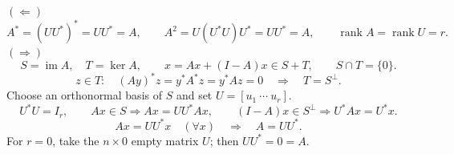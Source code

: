 \documentclass[UTF8,10pt,letterpaper,fontset=fandol]{ctexart}
\DeclareMathOperator{\rank}{rank}
\DeclareMathOperator{\im}{im}
\begin{document}
\textbf{$(\Leftarrow)$}
\[
 A^*=(UU^*)^*=UU^*=A,\qquad
 A^2=U(U^*U)U^*=UU^*=A,\qquad \rank A=\rank U=r.
\]
\textbf{$(\Rightarrow)$}
\[
 S=\im A,\quad T=\ker A,\qquad
 x=Ax+(I-A)x\in S+T,\qquad S\cap T=\{0\}.
\]
\[
 z\in T:\quad (Ay)^*z=y^*A^*z=y^*Az=0
 \quad\Longrightarrow\quad T=S^\perp.
\]
Choose an orthonormal basis of $S$ and set $U=[u_1\ \cdots\ u_r]$.
\[
 U^*U=I_r,\qquad Ax\in S\Longrightarrow Ax=UU^*Ax,
 \qquad (I-A)x\in S^\perp\Longrightarrow U^*Ax=U^*x.
\]
\[
 Ax=UU^*x\quad(\forall x)\quad\Longrightarrow\quad\boxed{A=UU^*}.
\]
For $r=0$, take the $n\times0$ empty matrix $U$; then $UU^*=0=A$.
\end{document}
